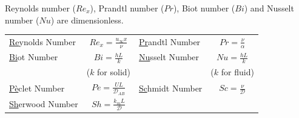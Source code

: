 \documentclass[11pt,a4paper]{article}
\begin{document}
Reynolds number ($Re_{x}$), Prandtl number ($Pr$), Biot number ($Bi$) and Nusselt number ($Nu$) are dimensionless.
\begin{table}[H]
    \centering
    \begin{tabular}{l c | l c}
        \toprule
        \underline{Re}ynolds Number & $\displaystyle Re_{x} = \frac{u_{\infty}x}{\nu}$ & \underline{Pr}andtl Number & $\displaystyle Pr =\frac{\nu}{\alpha}$\\ [2ex]  
        
        \underline{Bi}ot Number &  $\displaystyle Bi = \frac{hL}{k}$ & \underline{Nu}sselt Number &  $\displaystyle Nu= \frac{hL}{k}$ \\
        & ($k$ for solid) && ($k$ for fluid)\\
        \midrule
        \underline{P\`e}clet Number &  $\displaystyle Pe = \frac{UL}{\mathcal{D}_{AB}}$ & \underline{Sc}hmidt Number &  $\displaystyle Sc = \frac{\nu}{\mathcal{D}}$ \\[2.2ex]  
        \underline{Sh}erwood Number &  $\displaystyle Sh = \frac{k_m L}{\mathcal{D}}$   &   & \\
        \bottomrule
    \end{tabular}
\end{table}
\end{document}
